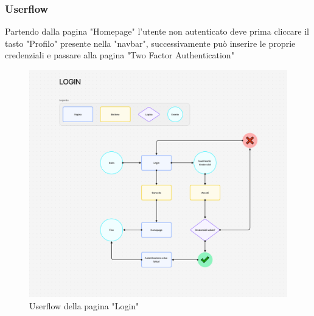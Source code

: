 \documentclass{report}
\begin{document}
\subsubsection*{Userflow}
Partendo dalla pagina "Homepage" l'utente non autenticato deve prima cliccare il tasto "Profilo" presente nella "navbar", successivamente può inserire le proprie credenziali e passare alla pagina "Two Factor Authentication"
\begin{figure}[H]
	\centering\includegraphics[width=1\textwidth]{images/microservizio-autenticazione/frontend/accesso-userflow.png}
	Userflow della pagina "Login"
\end{figure}
\end{document}
